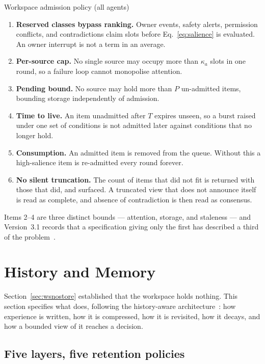 \documentclass[11pt]{article}
\begin{document}
\begin{specbox}{Workspace admission policy (all agents)}
\begin{enumerate}[leftmargin=1.5em,itemsep=1pt]
\item \textbf{Reserved classes bypass ranking.} Owner events, safety alerts, permission conflicts, and contradictions claim slots before Eq.~\eqref{eq:salience} is evaluated. An owner interrupt is not a term in an average.
\item \textbf{Per-source cap.} No single source may occupy more than $\kappa_a$ slots in one round, so a failure loop cannot monopolise attention.
\item \textbf{Pending bound.} No source may hold more than $P$ un-admitted items, bounding storage independently of admission.
\item \textbf{Time to live.} An item unadmitted after $T$ expires unseen, so a burst raised under one set of conditions is not admitted later against conditions that no longer hold.
\item \textbf{Consumption.} An admitted item is removed from the queue. Without this a high-salience item is re-admitted every round forever.
\item \textbf{No silent truncation.} The count of items that did not fit is returned with those that did, and surfaced. A truncated view that does not announce itself is read as complete, and absence of contradiction is then read as consensus.
\end{enumerate}
\end{specbox}

Items 2--4 are three distinct bounds --- attention, storage, and staleness --- and Version~3.1 records that a specification giving only the first has described a third of the problem~\citep{yang2026v31}.

\section{History and Memory}
\label{sec:memory}

Section~\ref{sec:wsnostore} established that the workspace holds nothing. This section specifies what does, following the history-aware architecture~\citep{yang2026history}: how experience is written, how it is compressed, how it is revisited, how it decays, and how a bounded view of it reaches a decision.

\subsection{Five layers, five retention policies}
\end{document}
